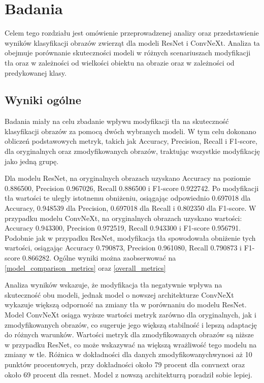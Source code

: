 \chapter*{Badania}

Celem tego rozdziału jest omówienie przeprowadzenej analizy oraz przedstawienie wyników klasyfikacji obrazów zwierząt dla modeli ResNet i ConvNeXt. Analiza ta obejmuje porównanie skuteczności modeli w różnych scenariuszach modyfikacji tła 
oraz w zależności od wielkości obiektu na obrazie oraz w zależności od predykowanej klasy.

\section*{Wyniki ogólne}

Badania miały na celu zbadanie wpływu modyfikacji tła na skuteczność klasyfikacji obrazów za pomocą dwóch wybranych modeli. W tym celu dokonano obliczeń podstawowych metryk, takich jak Accuracy, Precision, Recall i F1-score, dla oryginalnych 
oraz zmodyfikowanych obrazów, traktując wszystkie modyfikację jako jedną grupę.

Dla modelu ResNet, na oryginalnych obrazach uzyskano Accuracy na poziomie 0.886500, Precision 0.967026, Recall 0.886500 i F1-score 0.922742. Po modyfikacji tła wartości te uległy istotnemu obniżeniu, osiągając odpowiednio 0.697018 dla 
Accuracy, 0.948539 dla Precision, 0.697018 dla Recall i 0.802350 dla F1-score. W przypadku modelu ConvNeXt, na oryginalnych obrazach uzyskano wartości: Accuracy 0.943300, Precision 0.972519, Recall 0.943300 i F1-score 0.956791. Podobnie jak 
w przypadku ResNet, modyfikacja tła spowodowała obniżenie tych wartości, osiągając Accuracy 0.790873, Precision 0.961080, Recall 0.790873 i F1-score 0.866282. Ogólne wyniki można zaobserwować na \ref*{model_comparison_metrics} oraz \ref*{overall_metrics}

Analiza wyników wskazuje, że modyfikacja tła negatywnie wpływa na skuteczność obu modeli, jednak model o nowszej architekturze ConvNeXt wykazuje większą odporność na zmiany tła w porównaniu do modelu ResNet. Model ConvNeXt osiąga wyższe 
wartości metryk zarówno dla oryginalnych, jak i zmodyfikowanych obrazów, co sugeruje jego większą stabilność i lepszą adaptację do różnych warunków. Wartości metryk dla zmodyfikowanych obrazów są niższe w przypadku ResNet, co może 
wskazywać na większą wrażliwość tego modelu na zmiany w tle. Różnica w dokładności dla danych zmodyfikowanychwynosi aż 10 punktów procentowych, przy dokładności około 79 procent dla convnext oraz około 69 procent dla resnet. Model 
z nowszą architekturrą poradził sobie lepiej.

